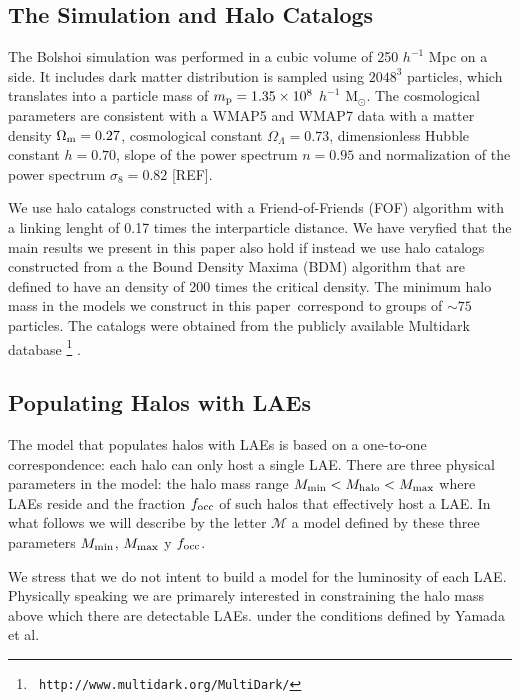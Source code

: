 \documentclass[usenatbib]{mn2e}
\newcommand{\documentname}{paper~}
\begin{document}
\subsection{The Simulation and Halo Catalogs}

The Bolshoi simulation was performed in a cubic volume of 250 $h^{-1}$
Mpc on a side. It includes dark matter distribution is sampled using
$2048^{3}$ particles, which translates into a particle mass of $m_{\rm
  p}=1.35\times 10^{8}$ $h^{-1}$ M$_{\odot}$.  The cosmological
parameters are consistent with a WMAP5 and WMAP7 data with a matter
density $\Omega_{\rm m} = 0.27$, cosmological constant
$\Omega_{\Lambda}=0.73$, dimensionless Hubble constant $h=0.70$, slope
of the power spectrum $n=0.95$ and normalization of the power spectrum
$\sigma_{8}=0.82$ [REF]. 

We use halo catalogs constructed with a Friend-of-Friends (FOF)
algorithm with a linking lenght of 0.17 times the interparticle
distance. We have veryfied that the main results we present in this
paper also hold if instead we use halo catalogs constructed from a the
Bound Density Maxima (BDM) algorithm \citep{KlypinBDM} that are
defined to have an density of 200 times the critical density. The
minimum halo mass in the models we construct in this \documentname correspond
to groups of $\sim 75$ particles. The catalogs were obtained from the
publicly available Multidark database \footnote{{\tt
    http://www.multidark.org/MultiDark/}}
\citep{2011arXiv1109.0003R}. 



\subsection{Populating Halos with LAEs}
\label{subsec:mocks}

The model that populates halos with LAEs is based on a one-to-one
correspondence: each halo can only host a single LAE. There are three
physical parameters in the model: the halo mass range $M_{\rm min}<
M_{\rm halo} < M_{\rm max}$ where LAEs reside and the fraction $f_{\rm
  occ}$ of such halos that effectively host a LAE. In what follows we
will describe by the letter ${\mathcal M}$ a model defined by these
three parameters $M_{\rm min}$, $M_{\rm max}$ y $f_{\rm occ}$. 

We stress that we do not intent to build a model for the luminosity of
each LAE. Physically speaking we are primarely interested in
constraining the halo mass above which there are detectable
LAEs. under the conditions defined by Yamada et al.  
\end{document}
